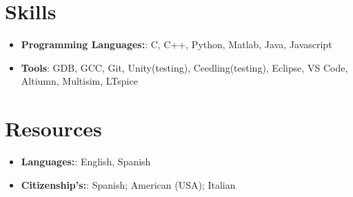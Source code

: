 \documentclass[letterpaper,11pt]{article}
\newcommand{\resumeItem}[2]{
  \item\small{
    \textbf{#1}{: #2 \vspace{-2pt}}
  }
}
\newcommand{\resumeSubItem}[2]{\resumeItem{#1}{#2}\vspace{-4pt}}
\newcommand{\resumeSubHeadingListStart}{\begin{itemize}[leftmargin=*]}
\newcommand{\resumeSubHeadingListEnd}{\end{itemize}}
\begin{document}
\section{Skills}
    \smallskip
    \resumeSubHeadingListStart
        \resumeSubItem{Programming Languages:}
            {C, C++, Python, Matlab, Java, Javascript}
    \smallskip
    \resumeSubItem{Tools}
            {GDB, GCC, Git, Unity(testing), Ceedling(testing), Eclipse, VS Code, Altiumn, Multisim, LTspice}
    \resumeSubHeadingListEnd
%
\smallskip
\section{Resources}
    \smallskip
    \resumeSubHeadingListStart
        \resumeSubItem{Languages:}
            {English, Spanish}
    \smallskip
    \resumeSubItem{Citizenship's:}
            {Spanish; American (USA); Italian}
    \resumeSubHeadingListEnd
 
    
    



\end{document}
